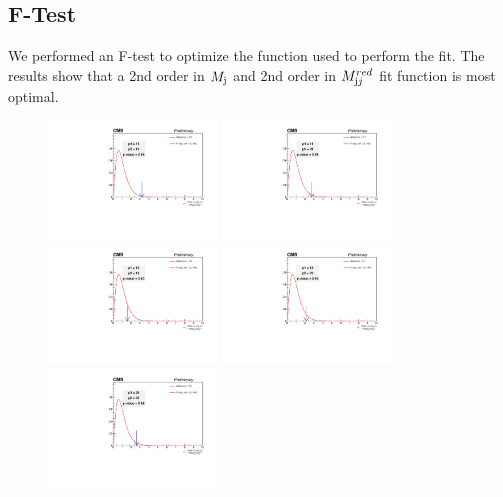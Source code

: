 \subsection{F-Test}
We performed an F-test to optimize the function used to perform the fit. The results show that a 2nd order in $M_{\textrm j}$ and 2nd order in $M_{\textrm jj}^{red}$ fit function is most optimal. 
\begin{figure}[!htb]
	\centering
	\includegraphics[width=0.4\textwidth]{Figures/ftest_vs_FTESTBNEWpol11_pol12_notoys.pdf}
	\includegraphics[width=0.4\textwidth]{Figures/ftest_vs_FTESTBNEWpol11_pol21_notoys.pdf}
	\includegraphics[width=0.4\textwidth]{Figures/ftest_vs_FTESTBNEWpol12_pol13_notoys.pdf}
	\includegraphics[width=0.4\textwidth]{Figures/ftest_vs_FTESTBNEWpol12_pol22_notoys.pdf}
	\includegraphics[width=0.4\textwidth]{Figures/ftest_vs_FTESTBNEWpol21_pol22_notoys.pdf}

\end{figure}
